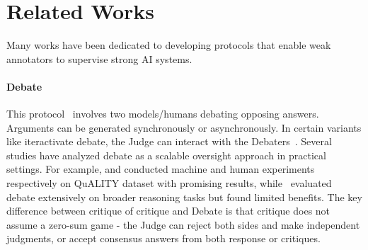\section{Related Works}




Many works have been dedicated to developing protocols that enable weak annotators to supervise strong AI systems.

\paragraph{Debate} This protocol~\citep{irving2018ai} involves two models/humans debating opposing answers. Arguments can be generated synchronously or asynchronously. In certain variants like iteractivate debate, the Judge can interact with the Debaters~\citep{khan2024debating}. Several studies have analyzed debate as a scalable oversight approach in practical settings. For example, \citet{khan2024debating} and \citet{michael2023debate} conducted machine and human experiments respectively on QuALITY dataset with promising results, while~\citet{kenton2024scalable} evaluated debate extensively on broader reasoning tasks but found limited benefits. The key difference between critique of critique and Debate is that critique does not assume a zero-sum game - the Judge can reject both sides and make independent judgments, or accept consensus answers from both response or critiques.

